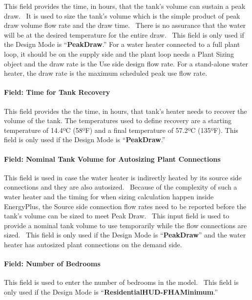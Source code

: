 This field provides the time, in hours, that the tank's volume can sustain a peak draw.~ It is used to size the tank's volume which is the simple product of peak draw volume flow rate and the draw time.~ There is no assurance that the water will be at the desired temperature for the entire draw.~ This field is only used if the Design Mode is ``\textbf{PeakDraw}.'' For a water heater connected to a full plant loop, it should be on the supply side and the plant loop needs a Plant Sizing object and the draw rate is the Use side design flow rate. For a stand-alone water heater, the draw rate is the maximum scheduled peak use flow rate.

\paragraph{Field: Time for Tank Recovery}\label{field-time-for-tank-recovery}

This field provides the the time, in hours, that tank's heater needs to recover the volume of the tank. The temperatures used to define recovery are a starting temperature of 14.4ºC (58ºF) and a final temperature of 57.2ºC (135ºF). This field is only used if the Design Mode is ``\textbf{PeakDraw}.''

\paragraph{Field: Nominal Tank Volume for Autosizing Plant Connections}\label{field-nominal-tank-volume-for-autosizing-plant-connections}

This field is used in case the water heater is indirectly heated by its source side connections and they are also autosized.~ Because of the complexity of such a water heater and the timing for when sizing calculation happen inside EnergyPlus, the Source side connection flow rates need to be reported before the tank's volume can be sized to meet Peak Draw.~ This input field is used to provide a nominal tank volume to use temporarily while the flow connections are sized.~ This field is only used if the Design Mode is ``\textbf{PeakDraw}'' and the water heater has autosized plant connections on the demand side.

\paragraph{Field: Number of Bedrooms}\label{field-number-of-bedrooms}

This field is used to enter the number of bedrooms in the model.~ This field is only used if the Design Mode is ``\textbf{ResidentialHUD-FHAMinimum}.''

